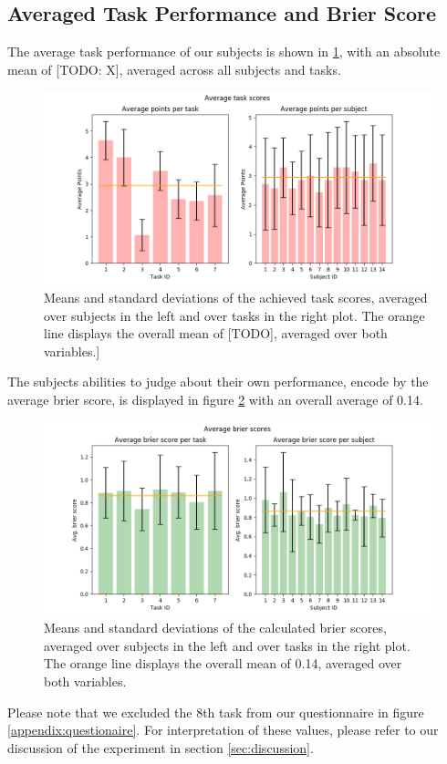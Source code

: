 \documentclass[../main/main.tex]{subfiles}
\begin{document}
\subsection{Averaged Task Performance and Brier Score}
The average task performance of our subjects is shown in \ref{fig:avg_scores}, with an absolute mean of [TODO: X], averaged across all subjects and tasks. 
\begin{figure}[h]
	\centering
	\captionsetup{justification=centering}
	\includegraphics[width=\textwidth]{../assets/average_task_scores.png}
	\caption{Means and standard deviations of the achieved task scores, averaged over subjects in the left and over tasks in the right plot. The orange line displays the overall mean of [TODO], averaged over both variables.]}
	\label{fig:avg_scores}
\end{figure}
The subjects abilities to judge about their own performance, encode by the average brier score, is displayed in figure \ref{fig:avg_brier} with an overall average of 0.14. 
\begin{figure}[h]
	\centering
	\captionsetup{justification=centering}
	\includegraphics[width=\textwidth]{../assets/average_brier_scores.png}
	\caption{Means and standard deviations of the calculated brier scores, averaged over subjects in the left and over tasks in the right plot. The orange line displays the overall mean of 0.14, averaged over both variables.}
	\label{fig:avg_brier} 
\end{figure}
Please note that we excluded the 8th task from our questionnaire in figure \ref{appendix:questionaire}. For interpretation of these values, please refer to our discussion of the experiment in section \ref{sec:discussion}.
\end{document}
